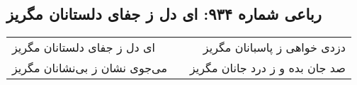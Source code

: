 \begin{center}
\section*{رباعی شماره ۹۳۴: ای دل ز جفای دلستانان مگریز}
\label{sec:0934}
\begin{longtable}{l p{0.5cm} r}
ای دل ز جفای دلستانان مگریز
&&
دزدی خواهی ز پاسبانان مگریز
\\
می‌جوی نشان ز بی‌نشانان مگریز
&&
صد جان بده و ز درد جانان مگریز
\\
\end{longtable}
\end{center}
